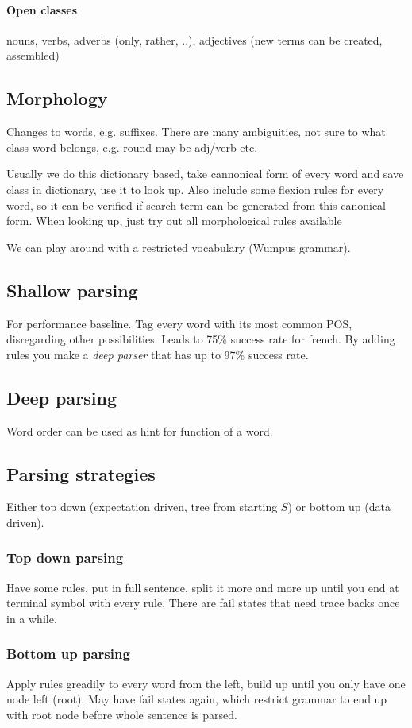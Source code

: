 \documentclass[11pt]{article}
\begin{document}
\paragraph{Open classes} nouns, verbs, adverbs (only, rather, ..), adjectives (new terms
can be created, assembled)

\subsection{Morphology}
Changes to words, e.g. suffixes. There are many ambiguities, not sure to what class
word belongs, e.g. round may be adj/verb etc.

Usually we do this dictionary based, take cannonical form of every word and save class in
dictionary, use it to look up. Also include some flexion rules for every word, so it can
be verified if search term can be generated from this canonical form. When looking up, just
try out all morphological rules available

We can play around with a restricted vocabulary (Wumpus grammar). 

\subsection{Shallow parsing}
For performance baseline. Tag every word with its most common POS, disregarding other
possibilities. Leads to 75\% success rate for french. By adding rules you make
a \emph{deep parser} that has up to 97\% success rate.

\subsection{Deep parsing}
Word order can be used as hint for function of a word.

\subsection{Parsing strategies}
Either top down (expectation driven, tree from starting $S$) or bottom up (data driven).

\subsubsection{Top down parsing}
Have some rules, put in full sentence, split it more and more up until you end at
terminal symbol with every rule. There are fail states that need trace backs once in a while.

\subsubsection{Bottom up parsing}
Apply rules greadily to every word from the left, build up until you only have one node
left (root). May have fail states again, which restrict grammar to end up with root
node before whole sentence is parsed.
\end{document}
